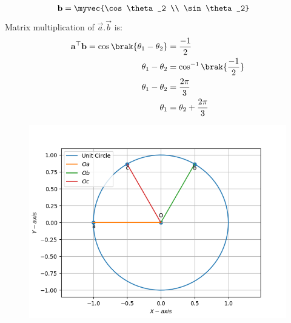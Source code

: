 \begin{enumerate}[label=\thesection.\arabic*,ref=\thesection.\theenumi]
\begin{align}
 \vec{b} &= \myvec{\cos \theta_2 \\ \sin \theta_2}
\end{align}
Matrix multiplication of 
$\vec{a}.\vec{b}$ is:
\begin{align}
 \vec{a}^{\top}\vec {b}= \cos \brak{\theta_1 -\theta_2} &= \frac{-1}{2}\\
 \theta_1 - \theta_2& =\cos^{-1} \brak{\frac{-1}{2}}\\
 \theta_1 - \theta_2 &= \frac{2\pi}{3}\\
 \theta_1 &= \theta_2 +\frac{2\pi}{3}
\end{align}
  \begin{figure}[H]
   \centering        
   \includegraphics[width=\columnwidth]{figs/figg.jpeg}
   \caption{}       
   \label{fig:python generated plot}
  \end{figure}
\end{enumerate}
